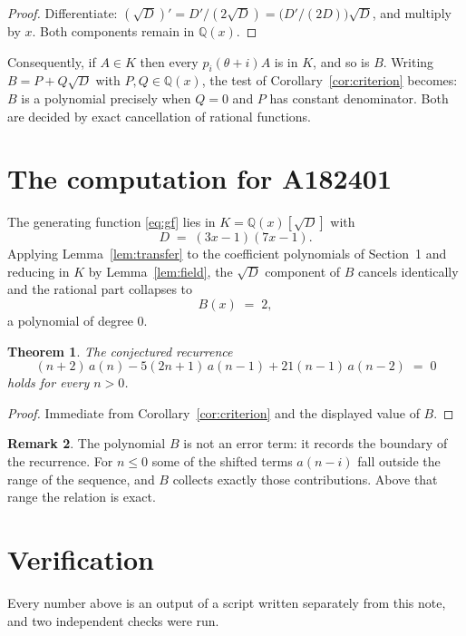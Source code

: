 \documentclass[11pt,a4paper]{article}
\theoremstyle{plain}
\newtheorem{theorem}{Theorem}
\theoremstyle{definition}
\newtheorem{remark}[theorem]{Remark}
\begin{document}
\begin{proof}
Differentiate: $(\sqrt{D})'=D'/(2\sqrt{D})=\bigl(D'/(2D)\bigr)\sqrt{D}$, and multiply by
$x$. Both components remain in $\mathbb{Q}(x)$.
\end{proof}

Consequently, if $A\in K$ then every $p_{i}(\theta+i)A$ is in $K$, and so is $B$. Writing
$B=P+Q\sqrt{D}$ with $P,Q\in\mathbb{Q}(x)$, the test of Corollary~\ref{cor:criterion}
becomes: $B$ is a polynomial precisely when $Q=0$ and $P$ has constant denominator. Both
are decided by exact cancellation of rational functions.

\section{The computation for A182401}

The generating function \eqref{eq:gf} lies in $K=\mathbb{Q}(x)[\sqrt{D}]$ with
\[
D \;=\; \left(3 x - 1\right) \left(7 x - 1\right) .
\]
Applying Lemma~\ref{lem:transfer} to the coefficient polynomials of Section~1 and reducing
in $K$ by Lemma~\ref{lem:field}, the $\sqrt{D}$ component of $B$ cancels identically and
the rational part collapses to
\[
B(x)\;=\;2 ,
\]
a polynomial of degree $0$.

\begin{theorem}
The conjectured recurrence
\[
(n + 2)\,a(n) -  5 \left(2 n + 1\right)\,a(n-1) + 21 \left(n - 1\right)\,a(n-2) \;=\;0
\]
holds for every $n>0$.
\end{theorem}

\begin{proof}
Immediate from Corollary~\ref{cor:criterion} and the displayed value of $B$.
\end{proof}

\begin{remark}
The polynomial $B$ is not an error term: it records the boundary of the recurrence. For
$n\le0$ some of the shifted terms $a(n-i)$ fall outside the range of the sequence,
and $B$ collects exactly those contributions. Above that range the relation is exact.
\end{remark}

\section{Verification}

Every number above is an output of a script written separately from this note, and two
independent checks were run.
\end{document}
